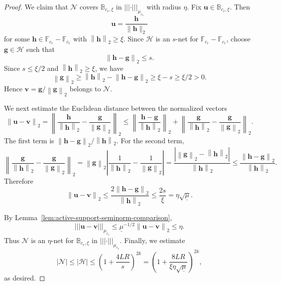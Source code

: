 \documentclass[10pt,a4paper]{amsart}
\newcommand*{\snorm}[2]{\left\vert\!\left\vert\!\left\vert #1 \right\vert\!\right\vert\!\right\vert_{#2}}
\begin{document}
\begin{proof}
  We claim that $\mathcal N$ covers $\mathbb B_{c_r,\xi}$ in
  $\snorm{\cdot}{\mu_{c_s}}$ with radius $\eta$. Fix
  $\mathbf u\in\mathbb B_{c_r,\xi}$. Then
  \[
    \mathbf u=\frac{\mathbf h}{\|\mathbf h\|_2}
  \]
  for some $\mathbf h\in\mathbb F_{c_r}-\mathbb F_{c_r}$ with
  $\left\|\mathbf h \right\|_2\geq \xi$. Since $\mathcal H$ is an $s$-net for
  $\mathbb F_{c_r}-\mathbb F_{c_r}$, choose $\mathbf g\in\mathcal H$ such
  that
  \[
    \left\|\mathbf h-\mathbf g\right\|_2\leq s.
  \]
  Since $s\leq \xi/2$ and $\left\|\mathbf h\right\|_2\geq\xi$, we have
  \[
    \left\|\mathbf g\right\|_2
    \geq
    \left\|\mathbf h\right\|_2-\left\|\mathbf h-\mathbf g\right\|_2
    \geq
    \xi-s
    \geq
    \xi/2
    >
    0.
  \]
  Hence $\mathbf v=\mathbf g/\left\|\mathbf g\right\|_2$ belongs to $\mathcal N$.
  
We next estimate the Euclidean distance between the normalized vectors
\[
 \left\|\mathbf u-\mathbf v\right\|_2 = 
  \left\|
    \frac{\mathbf h}{\left\|\mathbf h\right\|_2}
    -
    \frac{\mathbf g}{\left\|\mathbf g\right\|_2}
  \right\|_2
  \leq
  \left\|
    \frac{\mathbf h-\mathbf g}{\left\|\mathbf h\right\|_2}
  \right\|_2
  +
  \left\|
    \frac{\mathbf g}{\left\|\mathbf h\right\|_2}
    -
    \frac{\mathbf g}{\left\|\mathbf g\right\|_2}
  \right\|_2.
\]
The first term is $\left\|\mathbf h-\mathbf g\right\|_2/\left\|\mathbf h\right\|_2$.
For the second term,
\[
  \left\|
    \frac{\mathbf g}{\left\|\mathbf h\right\|_2}
    -
    \frac{\mathbf g}{\left\|\mathbf g\right\|_2}
  \right\|_2
  =
  \left\|\mathbf g\right\|_2
  \left|
    \frac{1}{\left\|\mathbf h\right\|_2}
    -
    \frac{1}{\left\|\mathbf g\right\|_2}
  \right|
  =
  \frac{\left|\left\|\mathbf g\right\|_2-\left\|\mathbf h\right\|_2\right|}
       {\left\|\mathbf h\right\|_2}
  \leq
  \frac{\left\|\mathbf h-\mathbf g\right\|_2}{\left\|\mathbf h\right\|_2}.
\]
Therefore
\[
  \left\|\mathbf u-\mathbf v\right\|_2
  \leq
  \frac{2\left\|\mathbf h-\mathbf g\right\|_2}{\left\|\mathbf h\right\|_2}
  \leq
  \frac{2s}{\xi}
  =
  \eta\sqrt{\underline{\mu}}.
\]

By Lemma~\ref{lem:active-support-seminorm-comparison},
\[
  \snorm{\mathbf u-\mathbf v}{\mu_{c_s}}
  \leq
  \underline{\mu}^{-1/2}
  \left\|\mathbf u-\mathbf v\right\|_2
  \leq
  \eta.
\]
Thus $\mathcal N$ is an $\eta$-net for $\mathbb B_{c_r,\xi}$ in
$\snorm{\cdot}{\mu_{c_s}}$. Finally, we estimate
\[
  \left|\mathcal N\right|
  \leq
  \left|\mathcal H\right|
  \leq
  \left(
    1+
    \frac{4LR}{s}
  \right)^{2k}
  =
  \left(
    1+
    \frac{8LR}
         {\xi\eta\sqrt{\underline{\mu}}}
  \right)^{2k},
\]
as desired.
\end{proof}
\end{document}
